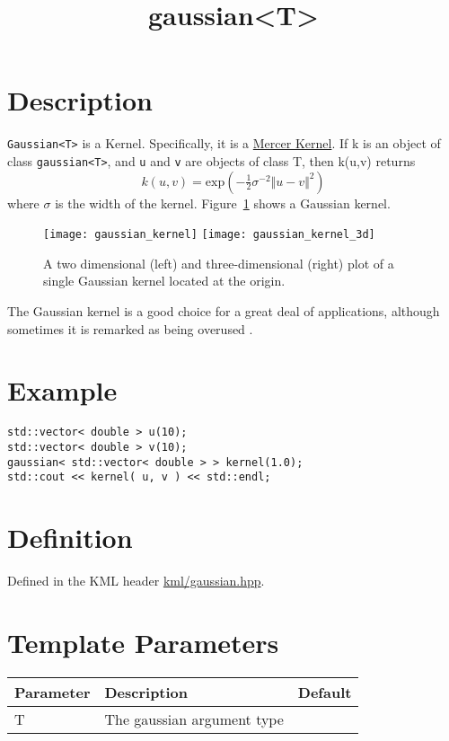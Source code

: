 \documentclass{article}
\newcommand{\half}{\tfrac{1}{2}}
\begin{document}
\title{gaussian<T>}
\maketitle

\section*{Description}

\texttt{Gaussian<T>} is a Kernel. Specifically, it is a \href{\kmlroot/mercer_kernel.html}{Mercer Kernel}. If k is an object of class \texttt{gaussian<T>}, and \texttt{u} and \texttt{v} are objects of class T, then k(u,v) returns
%
$$k(u,v) = \textrm{exp}( - \half \sigma^{-2} \Vert u-v \Vert^2 ) $$
%
where $\sigma$ is the width of the kernel. 
Figure~\ref{figure:gaussian_kernel} shows a Gaussian kernel.

\begin{figure}
\texttt{[image: gaussian\_kernel]}
\texttt{[image: gaussian\_kernel\_3d]}
\caption{A two dimensional (left) and three-dimensional (right) plot of a single Gaussian kernel located at the origin.}
\label{figure:gaussian_kernel}
\end{figure}

The Gaussian kernel is a good choice for a great deal of applications, although sometimes it is remarked as being
overused \cite{scholkopf02learning}.


\section*{Example}


\highlightcpp{}
\begin{verbatim}
std::vector< double > u(10);
std::vector< double > v(10);
gaussian< std::vector< double > > kernel(1.0);
std::cout << kernel( u, v ) << std::endl;
\end{verbatim}


\section*{Definition}

Defined in the KML header \href{\kmlsvnroot/kml/gaussian.hpp}{kml/gaussian.hpp}.


\section*{Template Parameters}

\begin{tabular}{lll}
\textbf{Parameter} & \textbf{Description} & \textbf{Default} \\ 
\hline
T & The gaussian argument type \\ 
\end{tabular}
\end{document}

